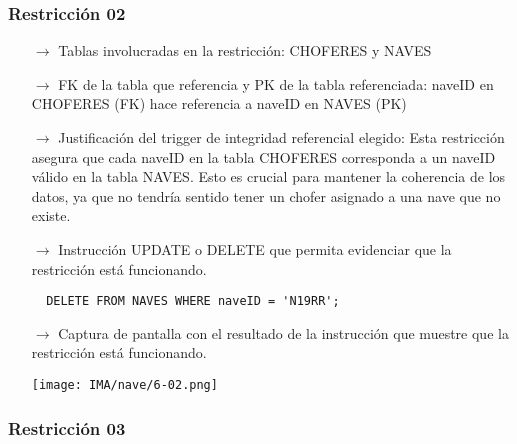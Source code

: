 \subsubsection*{Restricción 02}

\begin{itemize}
  \item[$\rightarrow$] Tablas involucradas en la restricción: CHOFERES y NAVES
  \item[$\rightarrow$] FK de la tabla que referencia y PK de la tabla referenciada: naveID en CHOFERES (FK) hace referencia a naveID en NAVES (PK)
  \item[$\rightarrow$] Justificación del trigger de integridad referencial elegido: Esta restricción asegura que cada naveID en la tabla CHOFERES corresponda a un naveID válido en la tabla NAVES. Esto es crucial para mantener la coherencia de los datos, ya que no tendría sentido tener un chofer asignado a una nave que no existe.
  \item[$\rightarrow$] Instrucción UPDATE o DELETE que permita evidenciar que la restricción está funcionando.
  \begin{verbatim}
  DELETE FROM NAVES WHERE naveID = 'N19RR';
  \end{verbatim}
  \item[$\rightarrow$] Captura de pantalla con el resultado de la instrucción que muestre que la restricción está funcionando.    
        \begin{center}
          \texttt{[image: IMA/nave/6-02.png]}
        \end{center}

\end{itemize}

\subsubsection*{Restricción 03}

